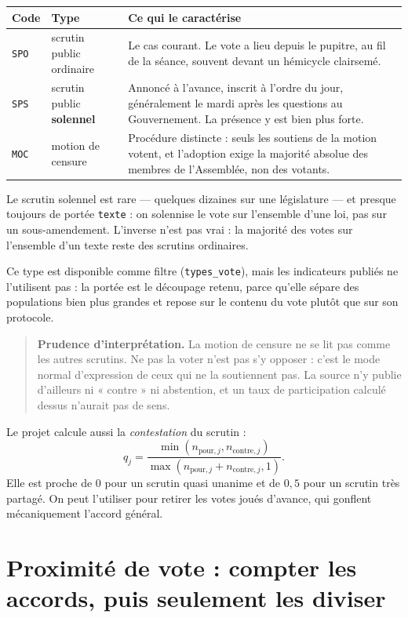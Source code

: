 \documentclass[11pt,a4paper]{article}
\newcommand{\code}[1]{\texttt{#1}}
\newcommand{\prudence}[1]{\begin{quote}\small\color{red!55!black}\textbf{Prudence d'interprétation.} #1\end{quote}}
\begin{document}
\begin{center}
\begin{tabular}{>{\raggedright\arraybackslash}p{.10\linewidth}p{.30\linewidth}p{.50\linewidth}}
\toprule
Code & Type & Ce qui le caractérise \\
\midrule
\code{SPO} & scrutin public ordinaire & Le cas courant. Le vote a lieu depuis le pupitre, au fil de la séance, souvent devant un hémicycle clairsemé. \\
\code{SPS} & scrutin public \textbf{solennel} & Annoncé à l'avance, inscrit à l'ordre du jour, généralement le mardi après les questions au Gouvernement. La présence y est bien plus forte. \\
\code{MOC} & motion de censure & Procédure distincte : seuls les soutiens de la motion votent, et l'adoption exige la majorité absolue des membres de l'Assemblée, non des votants. \\
\bottomrule
\end{tabular}
\end{center}

Le scrutin solennel est rare — quelques dizaines sur une législature — et
presque toujours de portée \code{texte} : on solennise le vote sur l'ensemble
d'une loi, pas sur un sous-amendement. L'inverse n'est pas vrai : la majorité
des votes sur l'ensemble d'un texte reste des scrutins ordinaires.

Ce type est disponible comme filtre (\code{types\_vote}), mais les indicateurs
publiés ne l'utilisent pas : la portée est le découpage retenu, parce qu'elle
sépare des populations bien plus grandes et repose sur le contenu du vote
plutôt que sur son protocole.

\prudence{La motion de censure ne se lit pas comme les autres scrutins. Ne pas
la voter n'est pas s'y opposer : c'est le mode normal d'expression de ceux qui
ne la soutiennent pas. La source n'y publie d'ailleurs ni « contre » ni
abstention, et un taux de participation calculé dessus n'aurait pas de sens.}

Le projet calcule aussi la \emph{contestation} du scrutin :
\[
 q_j=\frac{\min(n_{\mathrm{pour},j},n_{\mathrm{contre},j})}
 {\max(n_{\mathrm{pour},j}+n_{\mathrm{contre},j},1)}.
\]
Elle est proche de $0$ pour un scrutin quasi unanime et de $0{,}5$ pour un
scrutin très partagé. On peut l'utiliser pour retirer les votes joués d'avance,
qui gonflent mécaniquement l'accord général.

\section{Proximité de vote : compter les accords, puis seulement les diviser}\label{sec:proximite}
\end{document}
